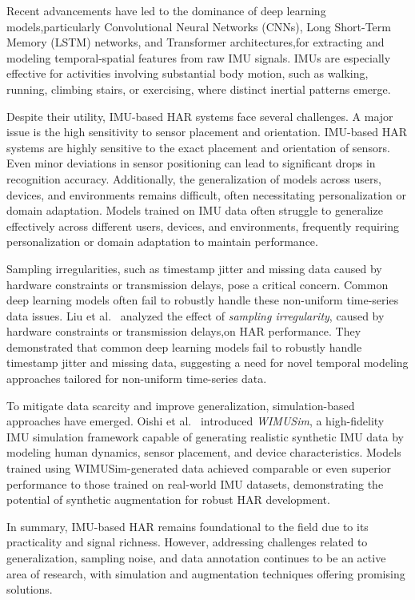 Recent advancements have led to the dominance of deep learning models,particularly Convolutional Neural Networks (CNNs), Long Short-Term Memory (LSTM) networks, and Transformer architectures,for extracting and modeling temporal-spatial features from raw IMU signals. IMUs are especially effective for activities involving substantial body motion, such as walking, running, climbing stairs, or exercising, where distinct inertial patterns emerge.

Despite their utility, IMU-based HAR systems face several challenges. A major issue is the high sensitivity to sensor placement and orientation. IMU-based HAR systems are highly sensitive to the exact placement and orientation of sensors. Even minor deviations in sensor positioning can lead to significant drops in recognition accuracy. Additionally, the generalization of models across users, devices, and environments remains difficult, often necessitating personalization or domain adaptation. Models trained on IMU data often struggle to generalize effectively across different users, devices, and environments, frequently requiring personalization or domain adaptation to maintain performance.

Sampling irregularities, such as timestamp jitter and missing data caused by hardware constraints or transmission delays, pose a critical concern. Common deep learning models often fail to robustly handle these non-uniform time-series data issues. Liu et al.~\cite{liu2025assessing} analyzed the effect of \textit{sampling irregularity}, caused by hardware constraints or transmission delays,on HAR performance. They demonstrated that common deep learning models fail to robustly handle timestamp jitter and missing data, suggesting a need for novel temporal modeling approaches tailored for non-uniform time-series data.

To mitigate data scarcity and improve generalization, simulation-based approaches have emerged. Oishi et al.~\cite{oishi2025wimusim} introduced \textit{WIMUSim}, a high-fidelity IMU simulation framework capable of generating realistic synthetic IMU data by modeling human dynamics, sensor placement, and device characteristics. Models trained using WIMUSim-generated data achieved comparable or even superior performance to those trained on real-world IMU datasets, demonstrating the potential of synthetic augmentation for robust HAR development.

In summary, IMU-based HAR remains foundational to the field due to its practicality and signal richness. However, addressing challenges related to generalization, sampling noise, and data annotation continues to be an active area of research, with simulation and augmentation techniques offering promising solutions.

